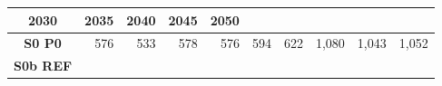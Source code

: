\documentclass[]{article}
\begin{document}
\begin{longtable}[]{@{}crrrrrrrrr@{}}
\begin{minipage}[b]{0.07\columnwidth}
2030\strut
\end{minipage} & \begin{minipage}[b]{0.07\columnwidth}\raggedleft\strut
2035\strut
\end{minipage} & \begin{minipage}[b]{0.07\columnwidth}\raggedleft\strut
2040\strut
\end{minipage} & \begin{minipage}[b]{0.07\columnwidth}\raggedleft\strut
2045\strut
\end{minipage} & \begin{minipage}[b]{0.07\columnwidth}\raggedleft\strut
2050\strut
\end{minipage}\tabularnewline
\midrule
\endhead
\begin{minipage}[t]{0.14\columnwidth}\centering\strut
\textbf{S0 P0}\strut
\end{minipage} & \begin{minipage}[t]{0.06\columnwidth}\raggedleft\strut
576\strut
\end{minipage} & \begin{minipage}[t]{0.06\columnwidth}\raggedleft\strut
533\strut
\end{minipage} & \begin{minipage}[t]{0.07\columnwidth}\raggedleft\strut
578\strut
\end{minipage} & \begin{minipage}[t]{0.07\columnwidth}\raggedleft\strut
576\strut
\end{minipage} & \begin{minipage}[t]{0.07\columnwidth}\raggedleft\strut
594\strut
\end{minipage} & \begin{minipage}[t]{0.07\columnwidth}\raggedleft\strut
622\strut
\end{minipage} & \begin{minipage}[t]{0.07\columnwidth}\raggedleft\strut
1,080\strut
\end{minipage} & \begin{minipage}[t]{0.07\columnwidth}\raggedleft\strut
1,043\strut
\end{minipage} & \begin{minipage}[t]{0.07\columnwidth}\raggedleft\strut
1,052\strut
\end{minipage}\tabularnewline
\begin{minipage}[t]{0.14\columnwidth}\centering\strut
\textbf{S0b REF}\strut
\end{minipage} & \begin{minipage}[t]{0.06\columnwidth}\raggedleft\strut

\end{minipage}
\end{longtable}
\end{document}
